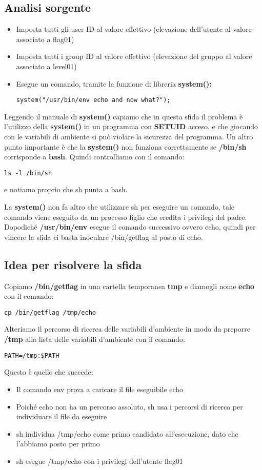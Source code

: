\subsection{Analisi sorgente}
\begin{itemize}
    \item Imposta tutti gli user ID al valore effettivo (elevazione dell’utente al valore associato a flag01) 
    \item Imposta tutti i group ID al valore effettivo (elevazione del gruppo al valore associato a level01) 
    \item Esegue un comando, tramite la funzione di libreria \textbf{system():} \begin{lstlisting}[style=cstyle]
        system("/usr/bin/env echo and now what?");
    \end{lstlisting}
\end{itemize}
Leggendo il manuale di \textbf{system()} capiamo che in questa sfida il problema è l’utilizzo della \textbf{system()} in un programma con \textbf{SETUID} acceso, e che giocando con le variabili di ambiente si può violare la sicurezza del programma.
Un altro punto importante è che la \textbf{system()} non funziona correttamente se \textbf{/bin/sh} corrisponde a \textbf{bash}. Quindi controlliamo con il comando: 
\begin{lstlisting}[style=bashstyle]
    ls -l /bin/sh
\end{lstlisting} 
e notiamo proprio che sh punta a bash.

La \textbf{system()} non fa altro che utilizzare sh per eseguire un comando, tale comando viene eseguito da un processo figlio che eredita i privilegi del padre.
Dopodiché \textbf{/usr/bin/env} esegue il comando successivo ovvero echo, quindi per vincere la sfida ci basta inoculare /bin/getflag al posto di echo.

\subsection{Idea per risolvere la sfida}
Copiamo \textbf{/bin/getflag} in una cartella temporanea \textbf{tmp} e diamogli nome \textbf{echo} con il comando: \begin{lstlisting}[style=bashstyle]
    cp /bin/getflag /tmp/echo
\end{lstlisting}
Alteriamo il percorso di ricerca delle variabili d'ambiente in modo da preporre \textbf{/tmp} alla lista delle variabili d'ambiente con il comando: 
\begin{lstlisting}[style=bashstyle]
    PATH=/tmp:$PATH
\end{lstlisting}
Questo è quello che succede:
\begin{itemize}
    \item Il comando env prova a caricare il file eseguibile echo
    \item Poiché echo non ha un percorso assoluto, sh usa i percorsi di ricerca per individuare il file da eseguire 
    \item sh individua /tmp/echo come primo candidato all’esecuzione, dato che l'abbiamo posto per primo
    \item sh esegue /tmp/echo con i privilegi dell’utente flag01
\end{itemize}

